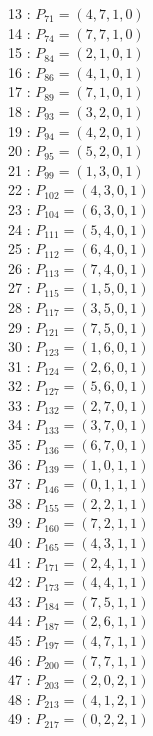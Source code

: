 \documentclass{article}
\begin{document}
{\begin{multicols}{3}
13 : $P_{71}=( 4, 7, 1, 0 )$\\
14 : $P_{74}=( 7, 7, 1, 0 )$\\
15 : $P_{84}=( 2, 1, 0, 1 )$\\
16 : $P_{86}=( 4, 1, 0, 1 )$\\
17 : $P_{89}=( 7, 1, 0, 1 )$\\
18 : $P_{93}=( 3, 2, 0, 1 )$\\
19 : $P_{94}=( 4, 2, 0, 1 )$\\
20 : $P_{95}=( 5, 2, 0, 1 )$\\
21 : $P_{99}=( 1, 3, 0, 1 )$\\
22 : $P_{102}=( 4, 3, 0, 1 )$\\
23 : $P_{104}=( 6, 3, 0, 1 )$\\
24 : $P_{111}=( 5, 4, 0, 1 )$\\
25 : $P_{112}=( 6, 4, 0, 1 )$\\
26 : $P_{113}=( 7, 4, 0, 1 )$\\
27 : $P_{115}=( 1, 5, 0, 1 )$\\
28 : $P_{117}=( 3, 5, 0, 1 )$\\
29 : $P_{121}=( 7, 5, 0, 1 )$\\
30 : $P_{123}=( 1, 6, 0, 1 )$\\
31 : $P_{124}=( 2, 6, 0, 1 )$\\
32 : $P_{127}=( 5, 6, 0, 1 )$\\
33 : $P_{132}=( 2, 7, 0, 1 )$\\
34 : $P_{133}=( 3, 7, 0, 1 )$\\
35 : $P_{136}=( 6, 7, 0, 1 )$\\
36 : $P_{139}=( 1, 0, 1, 1 )$\\
37 : $P_{146}=( 0, 1, 1, 1 )$\\
38 : $P_{155}=( 2, 2, 1, 1 )$\\
39 : $P_{160}=( 7, 2, 1, 1 )$\\
40 : $P_{165}=( 4, 3, 1, 1 )$\\
41 : $P_{171}=( 2, 4, 1, 1 )$\\
42 : $P_{173}=( 4, 4, 1, 1 )$\\
43 : $P_{184}=( 7, 5, 1, 1 )$\\
44 : $P_{187}=( 2, 6, 1, 1 )$\\
45 : $P_{197}=( 4, 7, 1, 1 )$\\
46 : $P_{200}=( 7, 7, 1, 1 )$\\
47 : $P_{203}=( 2, 0, 2, 1 )$\\
48 : $P_{213}=( 4, 1, 2, 1 )$\\
49 : $P_{217}=( 0, 2, 2, 1 )$\\

\end{multicols}}
\end{document}
